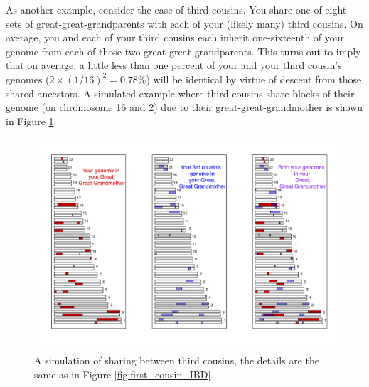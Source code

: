 As another example, consider the case of third cousins. You share one of eight sets of great-great-grandparents with each of your (likely many) third cousins. On average, you and each of your third cousins each inherit one-sixteenth of your genome from each of those two great-great-grandparents. This turns out to imply that on average, a little less than one percent of your and your third cousin's genomes ($2 \times (1/16)^2 =0.78\%$) will be identical by virtue of descent from those shared ancestors. A simulated example where third cousins share blocks of their genome (on chromosome 16 and 2) due to their great-great-grandmother is shown in Figure \ref{fig:third_cousin_IBD}.

\begin{figure}
\begin{center}
\includegraphics[width= \textwidth]{figures/sharing_relatives/Third_cousin_overlap_1.png}
\end{center}
\caption[]{A simulation of sharing between third cousins, the details are the same as in Figure \ref{fig:first_cousin_IBD}.} \label{fig:third_cousin_IBD}
\end{figure}


